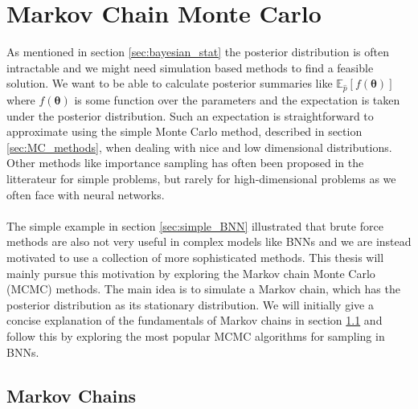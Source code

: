 \section{Markov Chain Monte Carlo}\label{sec:MCMC}
 As mentioned in section \ref{sec:bayesian_stat} the posterior distribution is often intractable and we might need simulation based methods to find a feasible solution. We want to be able to calculate posterior summaries like $\mathbb{E}_{\hat{p}}\left[f(\boldsymbol{\theta})\right]$ where $f(\boldsymbol{\theta})$ is some function over the parameters and the expectation is taken under the posterior distribution. Such an expectation is straightforward to approximate using the simple Monte Carlo method, described in section \ref{sec:MC_methods}, when dealing with nice and low dimensional distributions. Other methods like importance sampling has often been proposed in the litterateur for simple problems, but rarely for high-dimensional problems as we often face with neural networks.
 \\
 \\
The simple example in section \ref{sec:simple_BNN} illustrated that brute force methods are also not very useful in complex models like BNNs and we are instead motivated to use a collection of more sophisticated methods. This thesis will mainly pursue this motivation by exploring the Markov chain Monte Carlo (MCMC) methods. The main idea is to simulate a Markov chain, which has the posterior distribution as its stationary distribution. We will initially give a concise explanation of the fundamentals of Markov chains in section \ref{sec:basic_mc} and follow this by exploring the most popular MCMC algorithms for sampling in BNNs.
 
 
\subsection{Markov Chains}\label{sec:basic_mc}

